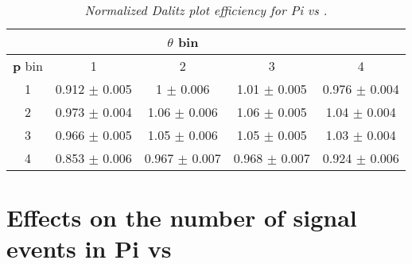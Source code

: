 \begin{table}[h!]
\begin{center}
\begin{tabular}{c c c c c}&  & $ \theta$ bin \\
\hline
\textbf{p} bin & 1 & 2 & 3 & 4\\ 
\hline
1 & 0.912 $\pm$ 0.005 & 1 $\pm$ 0.006 & 1.01 $\pm$ 0.005 & 0.976 $\pm$ 0.004 \\ 
2 & 0.973 $\pm$ 0.004 & 1.06 $\pm$ 0.006 & 1.06 $\pm$ 0.005 & 1.04 $\pm$ 0.004 \\ 
3 & 0.966 $\pm$ 0.005 & 1.05 $\pm$ 0.006 & 1.05 $\pm$ 0.005 & 1.03 $\pm$ 0.004 \\ 
4 & 0.853 $\pm$ 0.006 & 0.967 $\pm$ 0.007 & 0.968 $\pm$ 0.007 & 0.924 $\pm$ 0.006 \\ 
\end{tabular}
\end{center}
\caption{\textit{Normalized Dalitz plot efficiency for \4Pi vs \KlPiPi.}}
\end{table}
\clearpage
\section{Effects on the number of signal events in \4Pi vs \KsPiPi}

